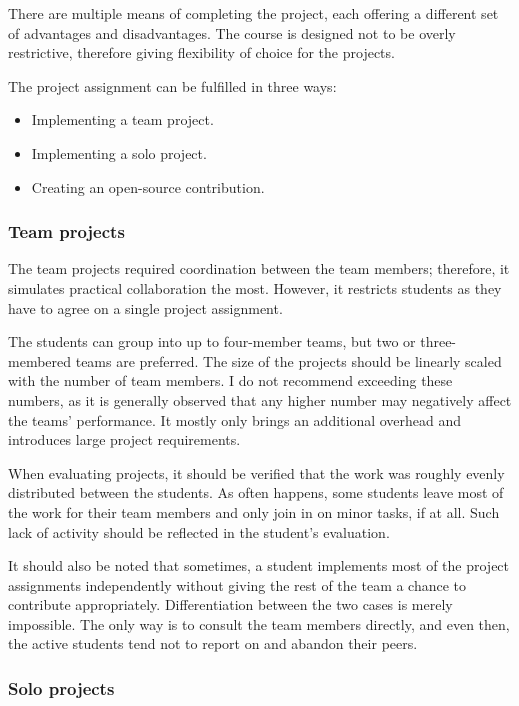 \documentclass[
  digital,
  color,
  oneside,
  nosansbold,
  nocolorbold,
  nolof,
  nolot,
]{fithesis4}
\begin{document}
There are multiple means of completing the project, each offering a different set of advantages and disadvantages. The course is designed not to be overly restrictive, therefore giving flexibility of choice for the projects.

The project assignment can be fulfilled in three ways:
\begin{itemize}
 \item Implementing a team project.
 \item Implementing a solo project.
 \item Creating an open-source contribution.
\end{itemize}

\subsubsection{Team projects}

The team projects required coordination between the team members; therefore, it simulates practical collaboration the most. However, it restricts students as they have to agree on a single project assignment. 

The students can group into up to four-member teams, but two or three-membered teams are preferred. The size of the projects should be linearly scaled with the number of team members. I do not recommend exceeding these numbers, as it is generally observed that any higher number may negatively affect the teams' performance. It mostly only brings an additional overhead and introduces large project requirements.

When evaluating projects, it should be verified that the work was roughly evenly distributed between the students. As often happens, some students leave most of the work for their team members and only join in on minor tasks, if at all. Such lack of activity should be reflected in the student's evaluation.

It should also be noted that sometimes, a student implements most of the project assignments independently without giving the rest of the team a chance to contribute appropriately. Differentiation between the two cases is merely impossible. The only way is to consult the team members directly, and even then, the active students tend not to report on and abandon their peers.

\subsubsection{Solo projects}
\end{document}
